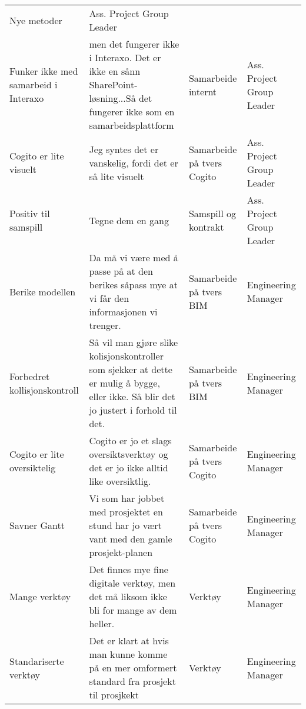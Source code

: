 \begin{landscape}
\begin{longtable}{p{0.25\textheight}p{0.5\textheight}p{0.25\textheight}p{0.25\textheight}}
      Nye metoder &
      Ass. Project Group Leader \\
    Funker ikke med samarbeid i Interaxo &
      men det fungerer ikke i Interaxo. Det er ikke en sånn SharePoint-løsning...Så det fungerer ikke som en samarbeidsplattform &
      Samarbeide internt &
      Ass. Project Group Leader \\
    Cogito er lite visuelt &
      Jeg syntes det er vanskelig, fordi det er så lite visuelt &
      Samarbeide på tvers Cogito &
      Ass. Project Group Leader \\
    Positiv til samspill &
      Tegne dem en gang &
      Samspill og kontrakt &
      Ass. Project Group Leader \\
    Berike modellen &
      Da må vi være med å passe på at den berikes såpass mye at vi får den informasjonen vi trenger. &
      Samarbeide på tvers BIM &
      Engineering Manager \\
    Forbedret kollisjonskontroll &
      Så vil man gjøre slike kolisjonskontroller som sjekker at dette er mulig å bygge, eller ikke. Så blir det jo justert i forhold til det. &
      Samarbeide på tvers BIM &
      Engineering Manager \\
    Cogito er lite oversiktelig &
      Cogito er jo et slags oversiktsverktøy og det er jo ikke alltid like oversiktlig. &
      Samarbeide på tvers Cogito &
      Engineering Manager \\
    Savner Gantt &
      Vi som har jobbet med prosjektet en stund har jo vært vant med den gamle prosjekt-planen &
      Samarbeide på tvers Cogito &
      Engineering Manager \\
    Mange verktøy &
      Det finnes mye fine digitale verktøy, men det må liksom ikke bli for mange av dem heller. &
      Verktøy &
      Engineering Manager \\
    Standariserte verktøy &
      Det er klart at hvis man kunne komme på en mer omformert standard fra prosjekt til prosjkekt &
      Verktøy &
      Engineering Manager \\* \bottomrule
    \end{longtable}
  \end{landscape}